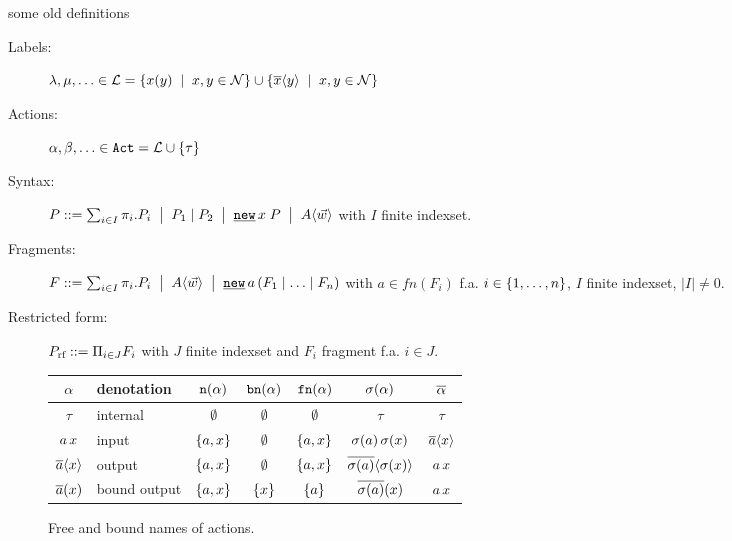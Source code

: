 \begin{old}{some old definitions}
\begin{description}
\item[Labels:] $\lambda, \mu, \ldots \in \labels = \set[x,y\in\names]{\inp{x}{y}} \cup \set[x,y\in\names]{\out{x}{y}}$
\item[Actions:] $\alpha, \beta, \ldots \in \actions = \labels \cup \set{\tau}$
\item[Syntax:] $P \syntdef \procsum \ebnf \procpar{P_1}{P_2} \ebnf \procres{x}{P} \ebnf \proccall{A}{\parl{w}}$ with $I$ finite indexset.
\item[Fragments:] $F\syntdef\procsum \ebnf \proccall{A}{\parl{w}} \ebnf \procres[e]{a}{\procpar{F_1}{\procpar{\ldots}{F_n}}}$ with $a\in fn(F_i)$ f.a. $i\in\set{1,\ldots,n}$, $I$ finite indexset, $\mid I\mid\neq0$.
\item[Restricted form:] $P_{\text{rf}}::= \Pi_{i\in J} F_i$ with $J$ finite indexset and $F_i$ fragment f.a. $i\in J$.
\end{description}
\end{old}

\begin{figure}[!h]
\centering
\begin{tabular}{c|l|c|c|c|c|c}%
$\alpha$      & denotation   & $\mathtt{n}(\alpha)$ & $\mathtt{bn}(\alpha)$ & $\mathtt{fn}(\alpha)$ & $\sigma(\alpha)$ & $\overline{\alpha}$\\\hline\hline%
$\tau$        & internal     & $\emptyset$  & $\emptyset$   & $\emptyset$   & $\tau$ & $\tau$\\%
$a\,x$  & input        & $\set{a,x}$  & $\emptyset$   & $\set{a,x}$   & $\sigma(a)\,\sigma(x)$ & $\overline{a}\langle x\rangle$\\%
$\overline{a}\langle x\rangle$  & output       & $\set{a,x}$  & $\emptyset$   & $\set{a,x}$   & $\overline{\sigma(a)}\langle\sigma(x)\rangle$ & $a\,x$\\%
$\overline{a}(x)$ & bound output & $\set{a,x}$  & $\set{x}$     & $\set{a}$     & $\overline{\sigma(a)}(x)$ & $a\,x$ %
\end{tabular}
\caption{Free and bound names of actions.}
\label{fig_names_act}
\end{figure}

